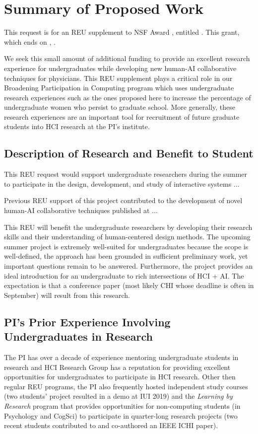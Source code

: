 \section*{Summary of Proposed Work}


This request is for an REU supplement to NSF Award \awardno, entitled \awardtitle.  
This grant, which ends on \awardenddate, 
\awardsummary.

We seek this small amount of additional funding to provide an excellent research experience for undergraduates while developing new human-AI collaborative techniques for physicians.  
This REU supplement plays a critical role in our Broadening Participation in Computing program which uses undergraduate research experiences such as the ones proposed here to increase the percentage of undergraduate women who persist to graduate school.  
More generally, these research experiences are an important tool for recruitment of future graduate students into HCI research at the PI's institute.

\subsection*{Description of Research and Benefit to Student}
This REU request would support \numstudents undergraduate researchers during the summer to participate in the design, development, and study of interactive systems
\xx ... 

Previous REU support of this project contributed to the development of novel human-AI collaborative techniques published at 
\xx ... 

This REU will benefit the undergraduate researchers by developing their research skills and their understanding of human-centered design methods. 
The upcoming summer project is extremely well-suited for undergraduates because the scope is well-defined, the approach has been grounded in sufficient preliminary work, yet important questions remain to be answered.
Furthermore, the project provides an ideal introduction for an undergraduate to rich intersections of HCI + AI.  
The expectation is that a conference paper (most likely CHI whose deadline is often in September) will result from this research.

\subsection*{PI's Prior Experience Involving Undergraduates in Research}
The PI has over a decade of experience mentoring undergraduate students in research and HCI Research Group has a reputation for providing excellent opportunities for undergraduates to participate in HCI research.
Other then regular REU programs, the PI also frequently hosted independent study courses (\eg two students' project resulted in a demo at IUI 2019) and the \emph{Learning by Research} program that provides opportunities for non-computing students (\eg in Psychology and CogSci) to participate in quarter-long research projects (\eg two recent students contributed to and co-authored an IEEE ICHI paper).


